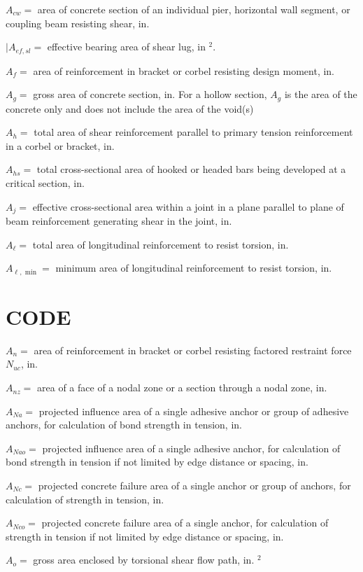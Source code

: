\documentclass[10pt]{article}
\begin{document}
$A_{c w}=$ area of concrete section of an individual pier, horizontal wall segment, or coupling beam resisting shear, in.  

$\mid A_{e f, s l}=$ effective bearing area of shear lug, in $^{2}$.

$A_{f}=$ area of reinforcement in bracket or corbel resisting design moment, in.  

$A_{g}=$ gross area of concrete section, in.   For a hollow section, $A_{g}$ is the area of the concrete only and does not include the area of the void(s)

$A_{h}=$ total area of shear reinforcement parallel to primary tension reinforcement in a corbel or bracket, in.  

$A_{h s}=$ total cross-sectional area of hooked or headed bars being developed at a critical section, in.  

$A_{j}=$ effective cross-sectional area within a joint in a plane parallel to plane of beam reinforcement generating shear in the joint, in.  

$A_{\ell}=$ total area of longitudinal reinforcement to resist torsion, in.  

$A_{\ell, \text { min }}=$ minimum area of longitudinal reinforcement to resist torsion, in.  

\section*{CODE}
$A_{n}=$ area of reinforcement in bracket or corbel resisting factored restraint force $N_{u c}$, in.  

$A_{n z}=$ area of a face of a nodal zone or a section through a nodal zone, in.  

$A_{N a}=$ projected influence area of a single adhesive anchor or group of adhesive anchors, for calculation of bond strength in tension, in.  

$A_{N a o}=$ projected influence area of a single adhesive anchor, for calculation of bond strength in tension if not limited by edge distance or spacing, in.  

$A_{N c}=$ projected concrete failure area of a single anchor or group of anchors, for calculation of strength in tension, in.  

$A_{N c o}=$ projected concrete failure area of a single anchor, for calculation of strength in tension if not limited by edge distance or spacing, in.  

$A_{o}=$ gross area enclosed by torsional shear flow path, in. $^{2}$
\end{document}
